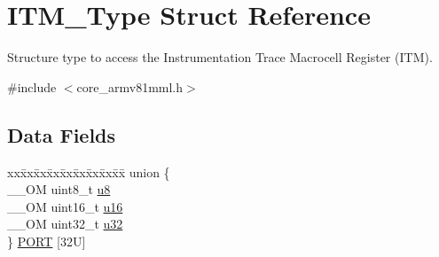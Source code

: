 \hypertarget{struct_i_t_m___type}{}\section{I\+T\+M\+\_\+\+Type Struct Reference}
\label{struct_i_t_m___type}


Structure type to access the Instrumentation Trace Macrocell Register (I\+TM).  




{\ttfamily \#include $<$core\+\_\+armv81mml.\+h$>$}

\subsection*{Data Fields}
\begin{DoxyCompactItemize}
\item 
\begin{tabbing}
xx\=xx\=xx\=xx\=xx\=xx\=xx\=xx\=xx\=\kill
union \{\\
\>\_\_OM uint8\_t \mbox{\hyperlink{struct_i_t_m___type_a4c0550e859d614c607bd4b575f05425c}{u8}}\\
\>\_\_OM uint16\_t \mbox{\hyperlink{struct_i_t_m___type_ae93660eefe2482a8564fae9a1ca39739}{u16}}\\
\>\_\_OM uint32\_t \mbox{\hyperlink{struct_i_t_m___type_ae89dd50f788f12863c681fba1a5b60d1}{u32}}\\
\} \mbox{\hyperlink{struct_i_t_m___type_a7203b1351025cde3c54dd83fdc6b7aab}{PORT}} \mbox{[}32U\mbox{]}\\


\end{tabbing}
\end{DoxyCompactItemize}
